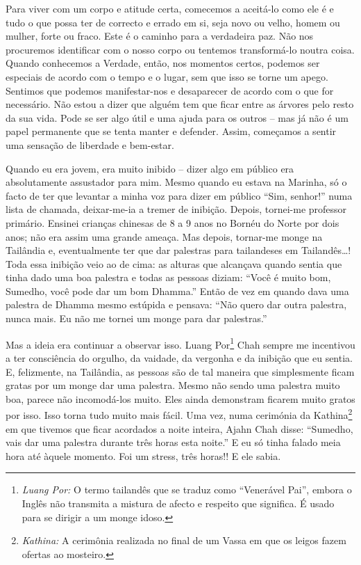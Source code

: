 Para viver com um corpo e atitude certa, comecemos a aceitá-lo como ele é e tudo
o que possa ter de correcto e errado em si, seja novo ou velho, homem ou mulher,
forte ou fraco. Este é o caminho para a verdadeira paz. Não nos procuremos
identificar com o nosso corpo ou tentemos transformá-lo noutra coisa. Quando
conhecemos a Verdade, então, nos momentos certos, podemos ser especiais de
acordo com o tempo e o lugar, sem que isso se torne um apego. Sentimos que
podemos manifestar-nos e desaparecer de acordo com o que for necessário. Não
estou a dizer que alguém tem que ficar entre as árvores pelo resto da sua vida.
Pode se ser algo útil e uma ajuda para os outros -- mas já não é um papel
permanente que se tenta manter e defender. Assim, começamos a sentir uma
sensação de liberdade e bem-estar.

Quando eu era jovem, era muito inibido -- dizer algo em público era
absolutamente assustador para mim. Mesmo quando eu estava na Marinha, só o facto
de ter que levantar a minha voz para dizer em público ``Sim, senhor!'' numa
lista de chamada, deixar-me-ia a tremer de inibição. Depois, tornei-me professor
primário. Ensinei crianças chinesas de 8 a 9 anos no Bornéu do Norte por dois
anos; não era assim uma grande ameaça. Mas depois, tornar-me monge na Tailândia
e, eventualmente ter que dar palestras para tailandeses em Tailandês\ldots{}! Toda
essa inibição veio ao de cima: as alturas que alcançava quando sentia que tinha
dado uma boa palestra e todas as pessoas diziam: ``Você é muito bom, Sumedho,
você pode dar um bom Dhamma.'' Então de vez em quando dava uma palestra de
Dhamma mesmo estúpida e pensava: ``Não quero dar outra palestra, nunca mais. Eu
não me tornei um monge para dar palestras.''

Mas a ideia era continuar a observar isso. Luang Por\footnote{\emph{Luang Por:} O termo
  tailandês que se traduz como ``Venerável Pai'', embora o Inglês não transmita a
  mistura de afecto e respeito que significa. É usado para se dirigir a um monge
  idoso.} Chah sempre me incentivou a ter consciência do orgulho, da vaidade, da
vergonha e da inibição que eu sentia. E, felizmente, na Tailândia, as pessoas
são de tal maneira que simplesmente ficam gratas por um monge dar uma palestra.
Mesmo não sendo uma palestra muito boa, parece não incomodá-los muito. Eles
ainda demonstram ficarem muito gratos por isso. Isso torna tudo muito mais
fácil. Uma vez, numa cerimónia da Kathina\footnote{\emph{Kathina:} A cerimônia
  realizada no final de um Vassa em que os leigos fazem ofertas ao mosteiro.} em
que tivemos que ficar acordados a noite inteira, Ajahn Chah disse: ``Sumedho,
vais dar uma palestra durante três horas esta noite.'' E eu só tinha falado meia
hora até àquele momento. Foi um stress, três horas!! E ele sabia.

